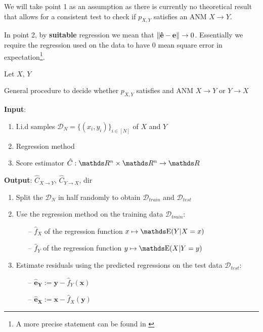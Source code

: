 We will take point 1 as an assumption as there is currently no theoretical result that allows for a consistent 
test to check if $p_{X, Y}$ satisfies an ANM $X \rightarrow Y$. 

In point 2, by \textbf{suitable} regression we mean that $\left\lVert\mathbf{\hat{e}} - \mathbf{e}\right\rVert \rightarrow 0$.
Essentially we require the regression used on the data to have 0 mean square error in expectation\footnote{A 
more precise statement can be found in \cite{Mooij2016jmlr}}. 

\begin{definition}
Let $X$, $Y$ 
    
\end{definition}




\begin{algorithm}[H]%

    \caption{General procedure to decide whether $p_{X, Y}$ satisfies and ANM $X \rightarrow Y$
        or $Y \rightarrow X$}
  
    \textbf{Input}:

    \begin{enumerate}
        \item I.i.d samples $\mathcal{D}_N = \{ (x_i, y_i )\}_{i \in [N]}$ of $X$ and $Y$
        \item Regression method
        \item Score estimator $\hat{C}: \R^n \times \R^n \rightarrow \R$
    \end{enumerate}
    
    \textbf{Output}: $\hat{C}_{X \rightarrow Y}$, $\hat{C}_{Y \rightarrow X}$, dir

    \begin{enumerate}

        \item Split the $\mathcal{D}_N$ in half randomly to obtain  $\mathcal{D}_{train}$ 
        and $\mathcal{D}_{test}$

        \item Use the regression method on the training data $\mathcal{D}_{train}$:
        \begin{itemize}
            \item[--] $\hat{f}_X$ of the regression function $x \mapsto \E(Y | X=x)$
            \item[--] $\hat{f}_Y$ of the regression function $y \mapsto \E(X | Y=y)$
        \end{itemize}

        \item Estimate residuals using the predicted regressions on the test data $\mathcal{D}_{test}$:
        \begin{itemize}
            \item[--] $ \mathbf{\hat{e}_Y} := \mathbf{y} - \hat{f}_Y(\mathbf{x})$
            \item[--] $ \mathbf{\hat{e}_X} := \mathbf{x} - \hat{f}_X(\mathbf{y})$
        \end{itemize}


\end{enumerate}
\end{algorithm}
